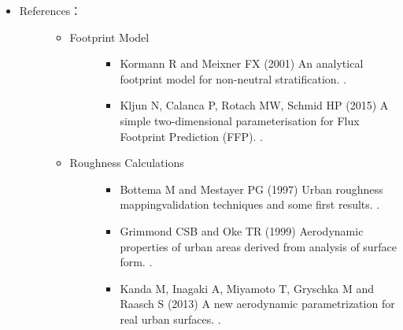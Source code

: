 \documentclass[letterpaper,10pt,english]{sphinxmanual}
\begin{document}
\begin{itemize}
\begin{description}
\begin{itemize}
\begin{itemize}
\end{itemize}

\end{itemize}

\end{description}

\item {} \begin{description}
\item[{References：}] \leavevmode\begin{itemize}
\item {} \begin{description}
\item[{Footprint Model}] \leavevmode\begin{itemize}
\item {} 
Kormann R and Meixner FX (2001) An analytical footprint model for
non-neutral stratification. .

\item {} 
Kljun N, Calanca P, Rotach MW, Schmid HP (2015) A simple
two-dimensional parameterisation for Flux Footprint Prediction (FFP).
.

\end{itemize}

\end{description}

\item {} \begin{description}
\item[{Roughness Calculations}] \leavevmode\begin{itemize}
\item {} 
Bottema M and Mestayer PG (1997) Urban roughness mapping\textendash{}validation
techniques and some first results. .

\item {} 
Grimmond CSB and Oke TR (1999) Aerodynamic properties of urban areas
derived from analysis of surface form. .

\item {} 
Kanda M, Inagaki A, Miyamoto T, Gryschka M and Raasch S (2013) A new
aerodynamic parametrization for real urban surfaces. .


\end{itemize}
\end{description}
\end{itemize}
\end{description}
\end{itemize}
\end{document}
